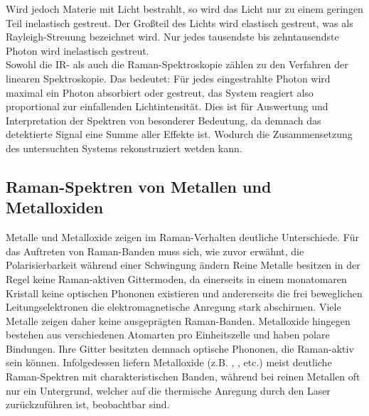 Wird jedoch Materie mit Licht bestrahlt, so wird das Licht nur zu einem geringen Teil inelastisch gestreut. Der Großteil des Lichts wird elastisch gestreut, was als Rayleigh-Streuung bezeichnet wird.
Nur jedes tausendste bis zehntausendste Photon wird inelastisch gestreut.\\
Sowohl die IR- als auch die Raman-Spektroskopie zählen zu den Verfahren der linearen Spektroskopie.
Das bedeutet: Für jedes eingestrahlte Photon wird maximal ein Photon absorbiert oder gestreut, das System reagiert also proportional zur einfallenden Lichtintensität. Dies ist für 
Auswertung und Interpretation der Spektren von besonderer Bedeutung, da demnach das detektierte Signal eine Summe aller Effekte ist. Wodurch die Zusammensetzung des untersuchten Systems 
rekonstruziert wetden kann.

\subsection{Raman-Spektren von Metallen und Metalloxiden}
Metalle und Metalloxide zeigen im Raman-Verhalten deutliche Unterschiede. Für das Auftreten von Raman-Banden muss sich, wie zuvor erwähnt, die Polarisierbarkeit während einer Schwingung ändern
Reine Metalle besitzen in der Regel keine Raman-aktiven Gittermoden, da einerseits in einem monatomaren Kristall keine optischen Phononen existieren und andererseits die frei beweglichen 
Leitungselektronen die elektromagnetische Anregung stark abschirmen.
Viele Metalle zeigen daher keine ausgeprägten Raman-Banden. Metalloxide hingegen bestehen aus verschiedenen Atomarten pro Einheitszelle und haben polare Bindungen. Ihre Gitter besitzten demnach 
optische Phononen, die Raman-aktiv sein können. Infolgedessen liefern Metalloxide (z.B. , ,  etc.) meist deutliche Raman-Spektren mit 
charakteristischen Banden, während bei reinen Metallen oft nur ein Untergrund, welcher auf die thermische Anregung durch den Laser zurückzuführen ist, beobachtbar sind.

